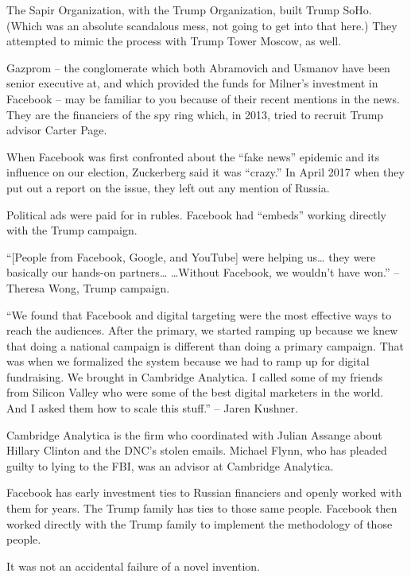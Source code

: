 \documentclass[11pt]{article}
\begin{document}
\begin{itemize}
The Sapir Organization, with the Trump Organization, built Trump SoHo. (Which was an absolute scandalous mess, not going to get into that here.) They attempted to mimic the process with Trump Tower Moscow, as well.

Gazprom – the conglomerate which both Abramovich and Usmanov have been senior executive at, and which provided the funds for Milner’s investment in Facebook – may be familiar to you because of their recent mentions in the news. They are the financiers of the spy ring which, in 2013, tried to recruit Trump advisor Carter Page.

When Facebook was first confronted about the “fake news” epidemic and its influence on our election, Zuckerberg said it was “crazy.” In April 2017 when they put out a report on the issue, they left out any mention of Russia.

Political ads were paid for in rubles. Facebook had “embeds” working directly with the Trump campaign.

“[People from Facebook, Google, and YouTube] were helping us… they were basically our hands-on partners… …Without Facebook, we wouldn’t have won.” – Theresa Wong, Trump campaign.

“We found that Facebook and digital targeting were the most effective ways to reach the audiences. After the primary, we started ramping up because we knew that doing a national campaign is different than doing a primary campaign. That was when we formalized the system because we had to ramp up for digital fundraising. We brought in Cambridge Analytica. I called some of my friends from Silicon Valley who were some of the best digital marketers in the world. And I asked them how to scale this stuff.” – Jaren Kushner.

Cambridge Analytica is the firm who coordinated with Julian Assange about Hillary Clinton and the DNC’s stolen emails. Michael Flynn, who has pleaded guilty to lying to the FBI, was an advisor at Cambridge Analytica.

Facebook has early investment ties to Russian financiers and openly worked with them for years. The Trump family has ties to those same people. Facebook then worked directly with the Trump family to implement the methodology of those people.

It was not an accidental failure of a novel invention.


\end{itemize}
\end{document}
